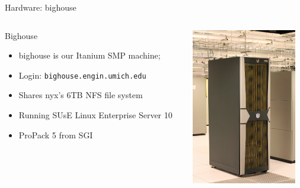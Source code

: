 \documentclass{beamer}
\begin{document}
  \begin{frame}{Hardware: bighouse}
   \begin{columns}[c]
    \begin{column}{7cm}
    \begin{block}{Bighouse}
    \begin{itemize}
      \item bighouse is our Itanium SMP machine;
      \item Login: \texttt{bighouse.engin.umich.edu}
      \item Shares nyx's 6TB NFS file system
      \item Running SUsE Linux Enterprise Server 10
      \item ProPack 5 from SGI
    \end{itemize}
   \end{block}
   \end{column}
   \begin{column}{5cm}
    \begin{center}\includegraphics[height=2.7in]{tallbighouse}\end{center}
   \end{column}
   \end{columns}
  \end{frame}
  
\end{document}
